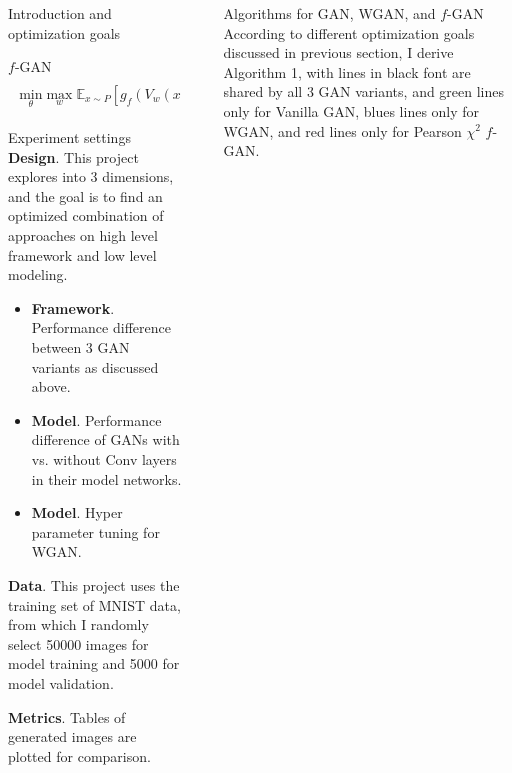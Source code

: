 \documentclass[final]{beamer}
\newlength{\sepwidth}
\newlength{\colwidth}
\newcommand{\separatorcolumn}{\begin{column}{\sepwidth}\end{column}}
\begin{document}
\begin{frame}[t]
\begin{columns}[t]
\begin{column}{\colwidth}
\begin{block}{Introduction and optimization goals}
\begin{alertblock}{$f$-GAN}
\begin{equation} 
\begin{split}
\begin{aligned}
    \underset{\theta}{\text{min}}\; \underset{w}{\text{max}} \; \mathbb{E}_{x\sim P} [g_f(V_w(x))] + \mathbb{E}_{x\sim Q_\theta} [-f^*(g_f(V_w(x)))]
\end{aligned}
\end{split}
\label{f_divergence_obj_ii}
\end{equation}
\end{alertblock}
  \end{block}
\begin{block}{Experiment settings}
{\bf Design}. This project explores into 3 dimensions, and the goal is to find an optimized combination of approaches on high level framework and low level modeling. 
\begin{itemize}
    \item {\bf Framework}. Performance difference between 3 GAN variants as discussed above.
    \item {\bf Model}. Performance difference of GANs with vs. without Conv layers in their model networks.
    \item {\bf Model}. Hyper parameter tuning for WGAN. 
\end{itemize}

{\bf Data}. This project uses the training set of MNIST data, from which I randomly select 50000 images for model training and 5000 for model validation. 

{\bf Metrics}. Tables of generated images are plotted for comparison. 


\end{block}





\end{column}

\separatorcolumn

\begin{column}{\colwidth}
  
    \begin{block}{Algorithms for GAN, WGAN, and $f$-GAN}
According to different optimization goals discussed in previous section, I derive Algorithm 1, with lines in black font are shared by all 3 GAN variants, and green lines only for Vanilla GAN, blues lines only for WGAN, and red lines only for Pearson $\chi^2$ $f$-GAN. 


\end{block}
\end{column}
\end{columns}
\end{frame}
\end{document}
